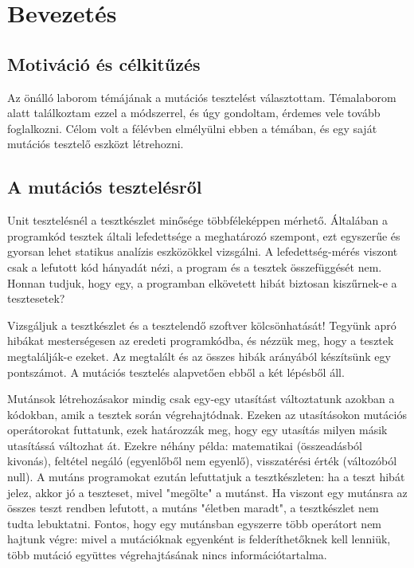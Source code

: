 
\section{Bevezetés}
\subsection{Motiváció és célkitűzés}
Az önálló laborom témájának a mutációs tesztelést választottam. Témalaborom alatt találkoztam ezzel a módszerrel, és úgy gondoltam, érdemes vele tovább foglalkozni. Célom volt a félévben elmélyülni ebben a témában, és egy saját mutációs tesztelő eszközt létrehozni. 
\subsection{A mutációs tesztelésről}
Unit tesztelésnél a tesztkészlet minősége többféleképpen mérhető. Általában a programkód tesztek általi lefedettsége a meghatározó szempont, ezt egyszerűe és gyorsan lehet statikus analízis eszközökkel vizsgálni. A lefedettség-mérés viszont csak a lefutott kód hányadát nézi, a program és a tesztek összefüggését nem. Honnan tudjuk, hogy egy, a programban elkövetett hibát biztosan kiszűrnek-e a tesztesetek?

Vizsgáljuk a tesztkészlet és a tesztelendő szoftver kölcsönhatását! Tegyünk apró hibákat mesterségesen az eredeti programkódba, és nézzük meg, hogy a tesztek megtalálják-e ezeket. Az megtalált és az összes hibák arányából készítsünk egy pontszámot. A mutációs tesztelés alapvetően ebből a két lépésből áll.

Mutánsok létrehozásakor mindig csak egy-egy utasítást változtatunk azokban a kódokban, amik a tesztek során végrehajtódnak. Ezeken az utasításokon mutációs operátorokat futtatunk, ezek határozzák meg, hogy egy utasítás milyen másik utasítássá változhat át. Ezekre néhány példa: matematikai (összeadásból kivonás), feltétel negáló (egyenlőből nem egyenlő), visszatérési érték (változóból null). A mutáns programokat ezután lefuttatjuk a tesztkészleten: ha a teszt hibát jelez, akkor jó a teszteset, mivel "megölte" a mutánst. Ha viszont egy mutánsra az összes teszt rendben lefutott, a mutáns "életben maradt", a tesztkészlet nem tudta lebuktatni. Fontos, hogy egy mutánsban egyszerre több operátort nem hajtunk végre: mivel a mutációknak egyenként is felderíthetőknek kell lenniük, több mutáció együttes végrehajtásának nincs információtartalma. 

